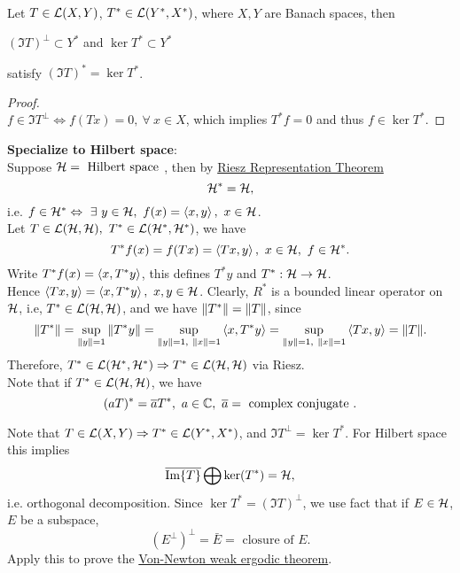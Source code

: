 \begin{proposition}\ \\
Let $T \in \mathcal{L}(X,Y)$, $T^* \in \mathcal{L}(Y^*, X^*)$, where $X,Y$ are Banach spaces, then
\begin{center}
    $(\Im{T})^\perp \subset Y^*$ and $\ker{T^*} \subset Y^*$
\end{center}
satisfy $(\Im{T})^* = \ker{T^*}$.
\end{proposition}
\begin{proof}\ \\
$f \in \Im{T}^\perp \Leftrightarrow f(Tx) = 0,\ \forall\ x \in X$, which implies $T^* f = 0$ and thus $f \in \ker{T^*}$.
\end{proof}

\np \textbf{Specialize to Hilbert space}:\\
Suppose $\mathcal{H} = \text{ Hilbert space }$, then by \hyperref[RRT]{Riesz Representation Theorem}
\begin{equation*}
    \mathcal{H}^* = \mathcal{H},
\end{equation*}
i.e. $f \in \Hs^* \Leftrightarrow\ \exists\ y \in \Hs,\ f(x) = \inprod{x}{y},\ x \in \Hs$.\\
Let $T \in \mathcal{L}(\mathcal{H},\mathcal{H}),\ T^* \in \mathcal{L}(\mathcal{H}^*,\mathcal{H}^*)$, we have
\begin{equation*}
    T^*f(x) = f(Tx) = \left\langle Tx, y \right\rangle,\ x \in \mathcal{H},\ f \in \mathcal{H}^*.
\end{equation*}
Write $T^* f(x) = \left\langle x, T^*y \right\rangle$, this defines $T^*y$ and $T^*: \mathcal{H} \to \mathcal{H}$.\\
Hence $\inprod{Tx}{y} = \inprod{x}{T^* y},\ x,y \in \Hs$. Clearly, $R^*$ is a bounded linear operator on $\mathcal{H}$, i.e, $T^* \in \mathcal{L}(\mathcal{H}, \mathcal{H})$, and we have $\norm{T^*} = \norm{T}$, since
\begin{equation*}
    \norm{T^*} = \sup_{\norm{y} = 1} \norm{T^* y} = \sup_{\norm{y} = 1,\ \norm{x} = 1} \left\langle x, T^* y \right\rangle = \sup_{\norm{y} = 1,\ \norm{x} = 1} \left\langle Tx, y \right\rangle = \norm{T}.
\end{equation*}
Therefore, $T^* \in \mathcal{L}(\mathcal{H}^*,\mathcal{H}^*) \Rightarrow T^* \in \mathcal{L}(\mathcal{H}, \mathcal{H})$ via Riesz.\\
Note that if $T^* \in \mathcal{L}(\mathcal{H},\mathcal{H})$, we have
\begin{equation*}
    (aT)^* = \bar{a} T^*,\ a \in \C,\ \bar{a} = \text{ complex conjugate }.
\end{equation*}

\np Note that $T \in \mathcal{L}(X,Y) \Rightarrow T^* \in \mathcal{L}(Y^*, X^*)$, and $\Im{T}^\perp = \ker{T^*}$. For Hilbert space this implies
\begin{equation*}
    \overline{\Im{T}} \bigoplus \ker(T^*) = \mathcal{H},
\end{equation*}
i.e. orthogonal decomposition. Since $\ker{T^*} = (\Im{T})^\perp$, we use fact that if $E \in \mathcal{H}$, $E$ be a subspace,
\begin{equation*}
    (E^\perp)^\perp = \bar{E} = \text{ closure of } E.
\end{equation*}
Apply this to prove the \underline{Von-Newton weak ergodic theorem}.


